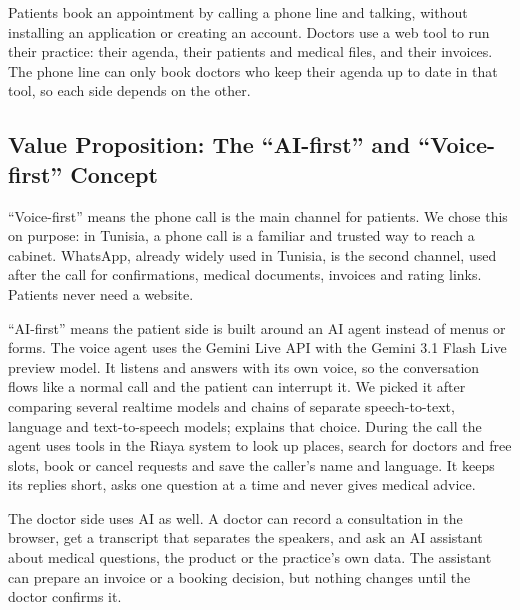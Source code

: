 Patients book an appointment by calling a phone line and talking, without installing an application or creating an account. Doctors use a web tool to run their practice: their agenda, their patients and medical files, and their invoices. The phone line can only book doctors who keep their agenda up to date in that tool, so each side depends on the other.

\subsection{Value Proposition: The ``AI-first'' and ``Voice-first'' Concept}
``Voice-first'' means the phone call is the main channel for patients. We chose this on purpose: in Tunisia, a phone call is a familiar and trusted way to reach a cabinet. WhatsApp, already widely used in Tunisia, is the second channel, used after the call for confirmations, medical documents, invoices and rating links. Patients never need a website.

``AI-first'' means the patient side is built around an AI agent instead of menus or forms. The voice agent uses the Gemini Live API with the Gemini 3.1 Flash Live preview model. It listens and answers with its own voice, so the conversation flows like a normal call and the patient can interrupt it. We picked it after comparing several realtime models and chains of separate speech-to-text, language and text-to-speech models;  explains that choice. During the call the agent uses tools in the Riaya system to look up places, search for doctors and free slots, book or cancel requests and save the caller's name and language. It keeps its replies short, asks one question at a time and never gives medical advice.

The doctor side uses AI as well. A doctor can record a consultation in the browser, get a transcript that separates the speakers, and ask an AI assistant about medical questions, the product or the practice's own data. The assistant can prepare an invoice or a booking decision, but nothing changes until the doctor confirms it.

